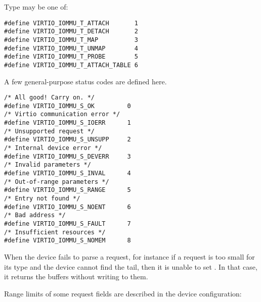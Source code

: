 Type may be one of:

\begin{lstlisting}
#define VIRTIO_IOMMU_T_ATTACH       1
#define VIRTIO_IOMMU_T_DETACH       2
#define VIRTIO_IOMMU_T_MAP          3
#define VIRTIO_IOMMU_T_UNMAP        4
#define VIRTIO_IOMMU_T_PROBE        5
#define VIRTIO_IOMMU_T_ATTACH_TABLE 6
\end{lstlisting}

A few general-purpose status codes are defined here.

\begin{lstlisting}
/* All good! Carry on. */
#define VIRTIO_IOMMU_S_OK         0
/* Virtio communication error */
#define VIRTIO_IOMMU_S_IOERR      1
/* Unsupported request */
#define VIRTIO_IOMMU_S_UNSUPP     2
/* Internal device error */
#define VIRTIO_IOMMU_S_DEVERR     3
/* Invalid parameters */
#define VIRTIO_IOMMU_S_INVAL      4
/* Out-of-range parameters */
#define VIRTIO_IOMMU_S_RANGE      5
/* Entry not found */
#define VIRTIO_IOMMU_S_NOENT      6
/* Bad address */
#define VIRTIO_IOMMU_S_FAULT      7
/* Insufficient resources */
#define VIRTIO_IOMMU_S_NOMEM      8
\end{lstlisting}

When the device fails to parse a request, for instance if a request is too
small for its type and the device cannot find the tail, then it is unable
to set . In that case, it returns the buffers without
writing to them.

Range limits of some request fields are described in the device
configuration:

